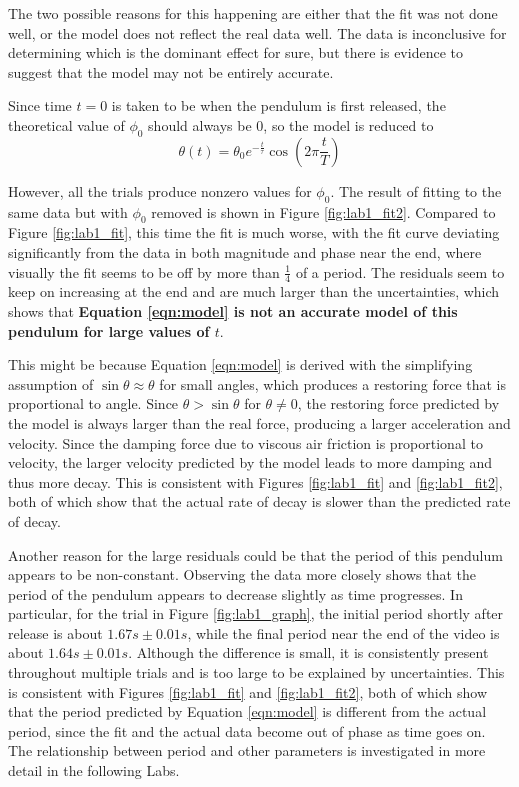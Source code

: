 \documentclass[aps,twocolumn,secnumarabic,nobalancelastpage,amsmath,amssymb,nofootinbib,floatfix,letterpaper]{revtex4}
\begin{document}
The two possible reasons for this happening are either that the fit was not done well, or the model does not reflect the
real data well. The data is inconclusive for determining which is the dominant effect for sure, but there is evidence to
suggest that the model may not be entirely accurate.

Since time \(t = 0\) is taken to be when the pendulum is first released, the theoretical value of \(\phi_0\) should
always be 0, so the model is reduced to
\begin{equation}
    \theta(t) = \theta_0 e^{-\frac{t}{\tau}}\cos\left(2\pi\frac{t}{T}\right)
    \label{eqn:model_nophi}
\end{equation}

However, all the trials produce nonzero values for \(\phi_0\). The result of fitting to the same data but with
\(\phi_0\) removed is shown in Figure \ref{fig:lab1_fit2}. Compared to Figure \ref{fig:lab1_fit}, this time the fit is
much worse, with the fit curve deviating significantly from the data in both magnitude and phase near the end, where
visually the fit seems to be off by more than \(\frac{1}{4}\) of a period. The residuals seem to keep on increasing at
the end and are much larger than the uncertainties, which shows that \textbf{Equation \ref{eqn:model} is not an
accurate model of this pendulum for large values of \(t\)}.

This might be because Equation \ref{eqn:model} is derived with the simplifying assumption of \(\sin \theta \approx \theta\)
for small angles, which produces a restoring force that is proportional to angle. Since \(\theta > \sin \theta\) for
\(\theta \neq 0\), the restoring force predicted by the model is always larger than the real force, producing a larger
acceleration and velocity. Since the damping force due to viscous air friction is proportional to velocity, the larger
velocity predicted by the model leads to more damping and thus more decay. This is consistent with Figures
\ref{fig:lab1_fit} and \ref{fig:lab1_fit2}, both of which show that the actual rate of decay is slower than the
predicted rate of decay.

Another reason for the large residuals could be that the period of this pendulum appears to be non-constant.
Observing the data more closely shows that the period of the pendulum appears to decrease slightly as time progresses.
In particular, for the trial in Figure \ref{fig:lab1_graph}, the initial period shortly after release is about
\(1.67\si{s} \pm 0.01\si{s}\), while the final period near the end of the video is about \(1.64\si{s} \pm 0.01\si{s}\).
Although the difference is small, it is consistently present throughout multiple trials and is too large to be explained
by uncertainties. This is consistent with Figures \ref{fig:lab1_fit} and \ref{fig:lab1_fit2}, both of which show that
the period predicted by Equation \ref{eqn:model} is different from the actual period, since the fit and the actual data
become out of phase as time goes on. The relationship between period and other parameters is investigated in more
detail in the following Labs.
\end{document}
